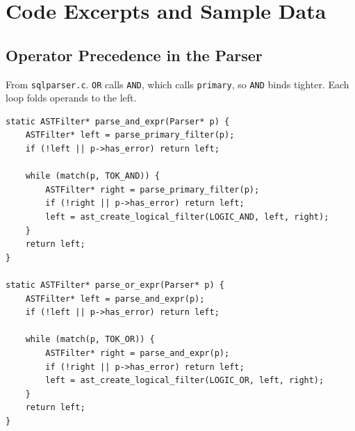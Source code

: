 \documentclass[12pt,a4paper]{report}
\newcommand{\codeus}{\textunderscore\allowbreak}
\DeclareRobustCommand{\code}[1]{\texttt{\let\_\codeus #1}}
\begin{document}
\chapter{Code Excerpts and Sample Data}

\section{Operator Precedence in the Parser}
From \code{sql\_parser.c}. \code{OR} calls \code{AND}, which calls \code{primary}, so \code{AND} binds tighter. Each loop folds operands to the left.
\begin{lstlisting}
static ASTFilter* parse_and_expr(Parser* p) {
    ASTFilter* left = parse_primary_filter(p);
    if (!left || p->has_error) return left;

    while (match(p, TOK_AND)) {
        ASTFilter* right = parse_primary_filter(p);
        if (!right || p->has_error) return left;
        left = ast_create_logical_filter(LOGIC_AND, left, right);
    }
    return left;
}

static ASTFilter* parse_or_expr(Parser* p) {
    ASTFilter* left = parse_and_expr(p);
    if (!left || p->has_error) return left;

    while (match(p, TOK_OR)) {
        ASTFilter* right = parse_and_expr(p);
        if (!right || p->has_error) return left;
        left = ast_create_logical_filter(LOGIC_OR, left, right);
    }
    return left;
}
\end{lstlisting}
\end{document}
